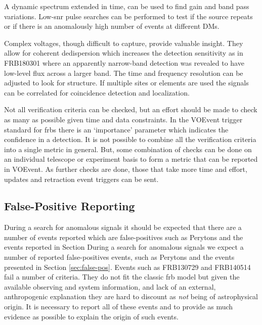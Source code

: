 \documentclass[a4paper,fleqn,usenatbib]{mnras}
\begin{document}
A dynamic spectrum extended in time, can be used to find gain and band pass
variations. Low-\gls{snr} pulse searches can be performed to test if the source
repeats or if there is an anomalously high number of events at different DMs.

Complex voltages, though difficult to capture, provide valuable insight.  They
allow for coherent dedispersion which increases the detection sensitivity as in
FRB180301 \citep{atel11376} where an apparently narrow-band detection was
revealed to have low-level flux across a larger band. The time and frequency
resolution can be adjusted to look for structure. If multiple sites or elements
are used the signals can be correlated for coincidence detection and
localization.

Not all verification criteria can be checked, but an effort
should be made to check as many as possible given time and data constraints.
In the VOEvent trigger standard for \glspl{frb}
\citep{2017arXiv171008155P} there is an `importance' parameter which indicates
the confidence in a detection. It is not possible to combine all the
verification criteria into a single metric in general. But, some combination of
checks can be done on an individual telescope or experiment basis to form a
metric that can be reported in VOEvent. As further checks are done, those that
take more time and effort, updates and retraction event triggers can be sent.

\subsection{False-Positive Reporting}

During a search for anomalous signals it should be expected that there are a
number of events reported which are false-positives such as Perytons
\citep{2011ApJ...727...18B} and the events reported in Section During a search
for anomalous signals we expect a number of reported false-positives events,
such as Perytons \citep{2011ApJ...727...18B} and the events presented in Section
\ref{sec:false-pos}.  Events such as FRB130729 and FRB140514 fail a number of
criteria. They do not fit the classic \gls{frb} model but given the available
observing and system information, and lack of an external, anthropogenic
explanation they are hard to discount as \textit{not} being of astrophysical
origin. It is necessary to report all of these events and to provide as much
evidence as possible to explain the origin of such events.
\end{document}
